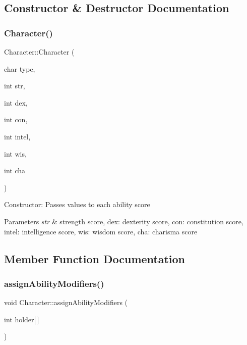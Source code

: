 \subsection{Constructor \& Destructor Documentation}
\hypertarget{class_character_aad0274b7a8cbb4fa8e0dddd0622d8870}{}\label{class_character_aad0274b7a8cbb4fa8e0dddd0622d8870} 
\subsubsection{\texorpdfstring{Character()}{Character()}}
{\footnotesize\ttfamily Character\+::\+Character (\begin{DoxyParamCaption}\item[{char}]{type,  }\item[{int}]{str,  }\item[{int}]{dex,  }\item[{int}]{con,  }\item[{int}]{intel,  }\item[{int}]{wis,  }\item[{int}]{cha }\end{DoxyParamCaption})}

Constructor\+: Passes values to each ability score 
\begin{DoxyParams}{Parameters}
{\em str} & strength score, dex\+: dexterity score, con\+: constitution score, intel\+: intelligence score, wis\+: wisdom score, cha\+: charisma score \\
\hline
\end{DoxyParams}


\subsection{Member Function Documentation}
\hypertarget{class_character_a233f495f8092c80cf1951fd075e77ca7}{}\label{class_character_a233f495f8092c80cf1951fd075e77ca7} 
\subsubsection{\texorpdfstring{assign\+Ability\+Modifiers()}{assignAbilityModifiers()}}
{\footnotesize\ttfamily void Character\+::assign\+Ability\+Modifiers (\begin{DoxyParamCaption}\item[{int}]{holder\mbox{[}$\,$\mbox{]} }\end{DoxyParamCaption})}

